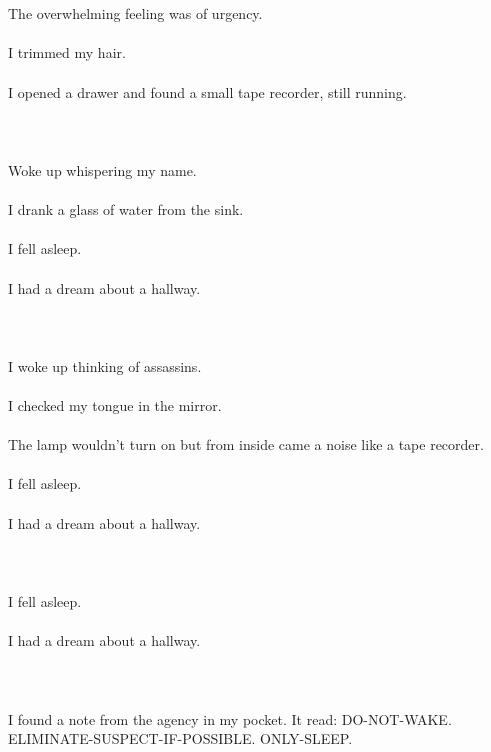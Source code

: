 \documentclass{article}
\begin{document}
    \section{}
    The overwhelming feeling was of urgency.\\\\I trimmed my hair.\\\\I opened a drawer and found a small tape recorder, still running.\\\\ 
    \newpage
    
    \section{}
    Woke up whispering my name.\\\\I drank a glass of water from the sink.\\\\I fell asleep.\\\\I had a dream about a hallway.\\\\ 
    \newpage
    
    \section{}
    I woke up thinking of assassins.\\\\I checked my tongue in the mirror.\\\\The lamp wouldn't turn on but from inside came a noise like a tape recorder.\\\\I fell asleep.\\\\I had a dream about a hallway.\\\\ 
    \newpage
    
    \section{}
    I fell asleep.\\\\I had a dream about a hallway.\\\\ 
    \newpage
    
    \section{}
    I found a note from the agency in my pocket. It read: DO-NOT-WAKE. ELIMINATE-SUSPECT-IF-POSSIBLE. ONLY-SLEEP.  
    \newpage
    
\end{document}
